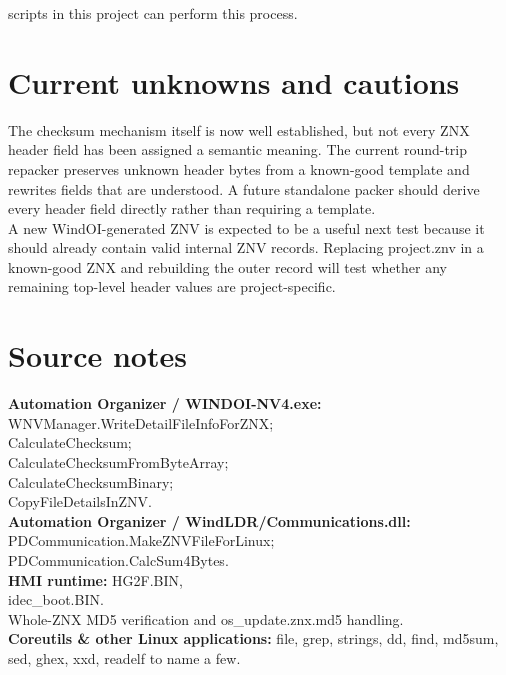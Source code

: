 \documentclass[]{article}
\begin{document}
scripts in this project can perform this process. 


\section{Current unknowns and cautions}
The checksum mechanism itself is now well established, but not every ZNX header field has been assigned a semantic meaning. The current round-trip repacker preserves unknown header bytes from a known-good template and rewrites fields that are understood. A future standalone packer should derive every header field directly rather than requiring a template. \\
A new WindOI-generated ZNV is expected to be a useful next test because it should already contain valid internal ZNV records. Replacing project.znv in a known-good ZNX and rebuilding the outer record will test whether any remaining top-level header values are project-specific.

\section{Source notes}
\textbf{Automation Organizer / WINDOI-NV4.exe:} WNVManager.WriteDetailFileInfoForZNX; \\CalculateChecksum;\\
CalculateChecksumFromByteArray; \\CalculateChecksumBinary; \\CopyFileDetailsInZNV. \\
\textbf{Automation Organizer / WindLDR/Communications.dll:} PDCommunication.MakeZNVFileForLinux;\\ PDCommunication.CalcSum4Bytes. \\
\textbf{HMI runtime:} HG2F.BIN,\\ idec\_boot.BIN. \\Whole-ZNX MD5 verification and os\_update.znx.md5 handling.\\
\textbf{Coreutils & other Linux applications:} file, grep, strings, dd, find, md5sum, sed, ghex, xxd, readelf to name a few.
\end{document}
